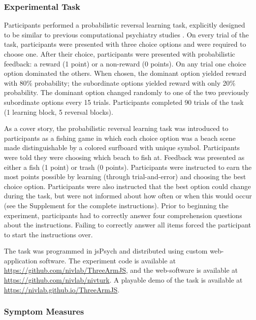 \documentclass[a4paper,notitlepage,12pt]{article}
\begin{document}
\begin{refsection}[main]
\subsubsection{Experimental Task}

Participants performed a probabilistic reversal learning task, explicitly designed to be similar to previous computational psychiatry studies \cite{waltz2007probabilistic, mukherjee_reward_2020}. On every trial of the task, participants were presented with three choice options and were required to choose one. After their choice, participants were presented with probabilistic feedback: a reward (1 point) or a non-reward (0 points). On any trial one choice option dominated the others. When chosen, the dominant option yielded reward with 80\% probability; the subordinate options yielded reward with only 20\% probability. The dominant option changed randomly to one of the two previously subordinate options every 15 trials. Participants completed 90 trials of the task (1 learning block, 5 reversal blocks). 

As a cover story, the probabilistic reversal learning task was introduced to participants as a fishing game in which each choice option was a beach scene made distinguishable by a colored surfboard with unique symbol. Participants were told they were choosing which beach to fish at. Feedback was presented as either a fish (1 point) or trash (0 points). Participants were instructed to earn the most points possible by learning (through trial-and-error) and choosing the best choice option. Participants were also instructed that the best option could change during the task, but were not informed about how often or when this would occur (see the Supplement for the complete instructions). Prior to beginning the experiment, participants had to correctly answer four comprehension questions about the instructions. Failing to correctly answer all items forced the participant to start the instructions over.

The task was programmed in jsPsych \cite{deleeuw_2015_jspsych} and distributed using custom web-application software. The experiment code is available at \url{https://github.com/nivlab/ThreeArmJS}, and the web-software is available at \url{https://github.com/nivlab/nivturk}. A playable demo of the task is available at \url{https://nivlab.github.io/ThreeArmJS}.

\subsubsection{Symptom Measures}


\end{refsection}
\end{document}
